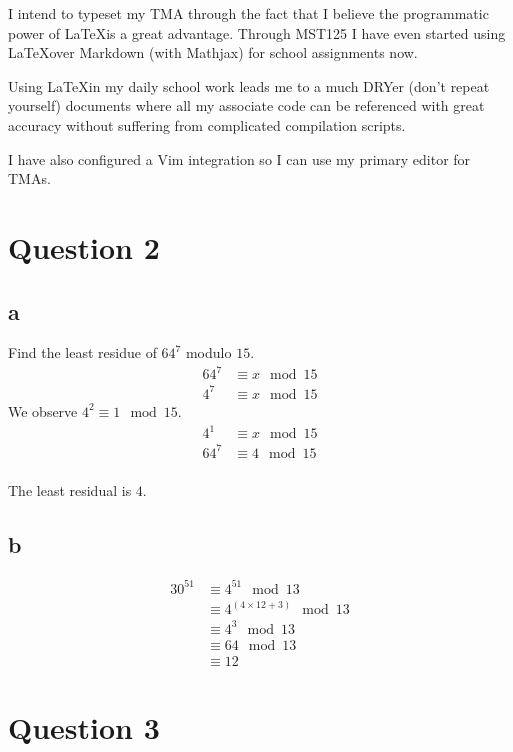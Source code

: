 \documentclass{article}
\begin{document}
I intend to typeset my TMA through the fact that I believe the programmatic power of \LaTeX is a great advantage. Through MST125 I have even started using \LaTeX over Markdown (with Mathjax) for school assignments now.

Using \LaTeX in my daily school work leads me to a much DRYer (don't repeat yourself) documents where all my associate code can be referenced with great accuracy without suffering from complicated compilation scripts.

I have also configured a Vim integration so I can use my primary editor for TMAs.

\section{Question 2}

\subsection{a}

Find the least residue of $64^7$ modulo $15$.
\begin{align*}
	64^7 & \equiv x \mod {15} \\
	4^7  & \equiv x \mod {15}
\end{align*}
We observe $4^2 \equiv 1 \mod {15}$.
\begin{align*}
	4^1  & \equiv x \mod {15} \\
	64^7 & \equiv 4 \mod {15} \\
\end{align*}

The least residual is $4$.

\subsection{b}

\begin{align*}
	30^{51} & \equiv 4^{51} \mod 13               \\
	        & \equiv 4^{(4 \times 12 + 3)}\mod 13 \\
	        & \equiv 4^3 \mod 13                  \\
	        & \equiv 64 \mod 13                   \\
	        & \equiv 12
\end{align*}

\section{Question 3}
\end{document}
